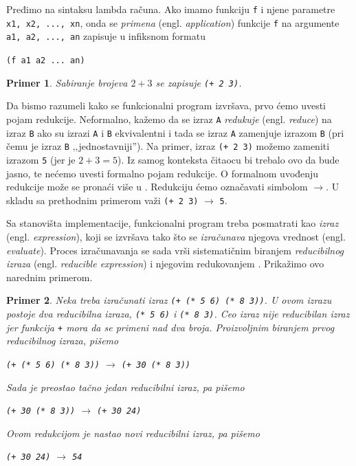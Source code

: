 \documentclass[a4paper]{article}
\newtheorem{primer}{Primer}[section]
\begin{document}
Pređimo na sintaksu lambda računa. Ako imamo funkciju \verb|f| i njene parametre \verb|x1, x2, ..., xn|, onda se \textit{primena} (engl. \textit{application}) funkcije \verb|f| na argumente \verb|a1, a2, ..., an| zapisuje u infiksnom formatu
\begin{center}
	\verb|(f a1 a2 ... an)|
\end{center}

\begin{primer}
	Sabiranje brojeva $2+3$ se zapisuje \verb|(+ 2 3)|.
\end{primer}

Da bismo razumeli kako se funkcionalni program izvršava, prvo ćemo uvesti pojam redukcije. Neformalno, kažemo da se izraz \verb|A| \textit{redukuje} (engl. \textit{reduce}) na izraz \verb|B| ako su izrazi \verb|A| i \verb|B| ekvivalentni i tada se izraz \verb|A| zamenjuje izrazom \verb|B| (pri čemu je izraz \verb|B| ‚‚jednostavniji''). Na primer, izraz \verb|(+ 2 3)| možemo zameniti izrazom \verb|5| (jer je $2+3=5$). Iz samog konteksta čitaocu bi trebalo ovo da bude jasno, te nećemo uvesti formalno pojam redukcije. O formalnom uvođenju redukcije može se pronaći više u \cite{foundations-of-functional-programming}. Redukciju ćemo označavati simbolom $\rightarrow$. U skladu sa prethodnim primerom važi \verb|(+ 2 3)| $\rightarrow$ \verb|5|.

Sa stanovišta implementacije, funkcionalni program treba posmatrati kao \textit{izraz} (engl. \textit{expression}), koji se izvršava tako što se \textit{izračunava} njegova vrednost (engl. \textit{evaluate}). Proces izračunavanja se sada vrši sistematičnim biranjem \textit{reducibilnog izraza} (engl. \textit{reducible expression}) i njegovim redukovanjem \cite{the-implementation-of-functional-programming-languages}. Prikažimo ovo narednim primerom.

\begin{primer}
	Neka treba izračunati izraz \verb|(+ (* 5 6) (* 8 3))|. U ovom izrazu postoje dva reducibilna izraza, \verb|(* 5 6)| i \verb|(* 8 3)|. Ceo izraz nije reducibilan izraz jer funkcija \verb|+| mora da se primeni nad dva broja. Proizvoljnim biranjem prvog reducibilnog izraza, pišemo
	\begin{center}
		\verb|(+ (* 5 6) (* 8 3))| $\rightarrow$ \verb|(+ 30 (* 8 3))|
	\end{center}
	Sada je preostao tačno jedan reducibilni izraz, pa pišemo
	\begin{center}
		\verb|(+ 30 (* 8 3))| $\rightarrow$ \verb|(+ 30 24)|
	\end{center}
	Ovom redukcijom je nastao novi reducibilni izraz, pa pišemo
	\begin{center}
		\verb|(+ 30 24)| $\rightarrow$ \verb|54|
	\end{center}
\end{primer}
\end{document}

